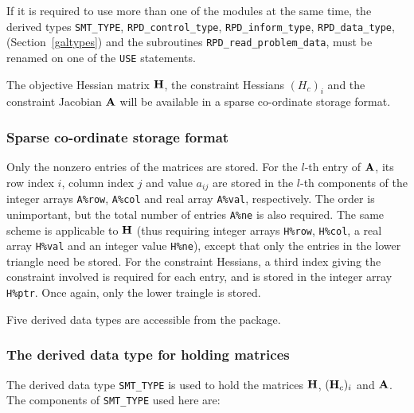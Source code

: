 \documentclass{galahad}
\newcommand{\packagename}{RPD}
\begin{document}


\noindent
If it is required to use more than one of the modules at the same time, 
the derived types
{\tt SMT\_TYPE},
{\tt \packagename\_control\_type},
{\tt \packagename\_inform\_type},
{\tt \packagename\_data\_type},
(Section~\ref{galtypes})
and the subroutines
{\tt \packagename\_read\_problem\_data},
must be renamed on one of the {\tt USE} statements.


\galmatrix
The objective Hessian matrix ${\mathbf{H}}$, the constraint Hessians $(H_c)_i$ and
the constraint Jacobian ${\mathbf{A}}$ will be available in a sparse co-ordinate
storage format.

\subsubsection{Sparse co-ordinate storage format}\label{coordinate}
Only the nonzero entries of the matrices are stored. For the
$l$-th entry of ${\mathbf{A}}$, its row index $i$, column index $j$
and value $a_{ij}$
are stored in the $l$-th components of the integer arrays {\tt A\%row},
{\tt A\%col} and real array {\tt A\%val}, respectively.
The order is unimportant, but the total
number of entries {\tt A\%ne} is also required.
The same scheme is applicable to
${\mathbf{H}}$ (thus requiring integer arrays {\tt H\%row}, {\tt H\%col}, a real array
{\tt H\%val} and an integer value {\tt H\%ne}),
except that only the entries in the lower triangle need be stored.
For the constraint Hessians, a third index giving the constraint involved
is required for each entry, and is stored in the integer array
{\tt H\%ptr}. Once again, only the lower traingle is stored.





\galtypes
Five derived data types are accessible from the package.


\subsubsection{The derived data type for holding matrices}\label{typesmt}
The derived data type {\tt SMT\_TYPE} is used to hold the matrices
${\mathbf{H}}$, $({\mathbf{H}}_c)_i$ and ${\mathbf{A}}$.
The components of {\tt SMT\_TYPE} used here are:
\end{document}
